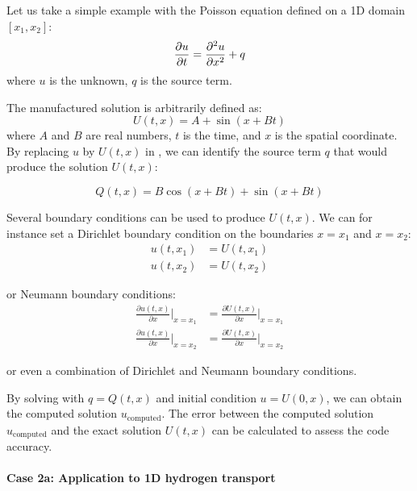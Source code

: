 Let us take a simple example with the Poisson equation defined on a 1D domain $[x_1, x_2]$:
\begin{equation}
    \frac{\partial u}{\partial t} = \frac{\partial^2 u}{\partial x^2} + q
    \labeq{poisson eq demo mms}
\end{equation}
where $u$ is the unknown, $q$ is the source term.

The manufactured solution is arbitrarily defined as:
\begin{equation}
    U(t, x) = A + \sin{(x + B t)}
\end{equation}
where $A$ and $B$ are real numbers, $t$ is the time, and $x$ is the spatial coordinate.
By replacing $u$ by $U(t, x)$ in , we can identify the source term $q$ that would produce the solution $U(t, x)$:

\begin{equation}
    Q(t, x) = B \cos{(x + B t)} + \sin{(x + B t)}
\end{equation}

Several boundary conditions can be used to produce $U(t, x)$.
We can for instance set a Dirichlet boundary condition on the boundaries $x=x_1$ and $x=x_2$:
\begin{align}
    u(t, x_1) &= U(t, x_1) \\
    u(t, x_2) &= U(t, x_2)
\end{align}

or Neumann boundary conditions:
\begin{align}
    \frac{\partial u(t, x)}{\partial x}\Big | _{ x=x_1} &= \frac{\partial U(t, x)}{\partial x} \Big | _{ x=x_1} \\
    \frac{\partial u(t, x)}{\partial x}\Big | _{ x=x_2} &= \frac{\partial U(t, x)}{\partial x} \Big | _{ x=x_2}
\end{align}

or even a combination of Dirichlet and Neumann boundary conditions.

By solving  with $q = Q(t, x)$ and initial condition $u = U(0, x)$, we can obtain the computed solution $u_\mathrm{computed}$.
The error between the computed solution $u_\mathrm{computed}$ and the exact solution $U(t, x)$ can be calculated to assess the code accuracy.

\paragraph{Case 2a: Application to 1D hydrogen transport}

